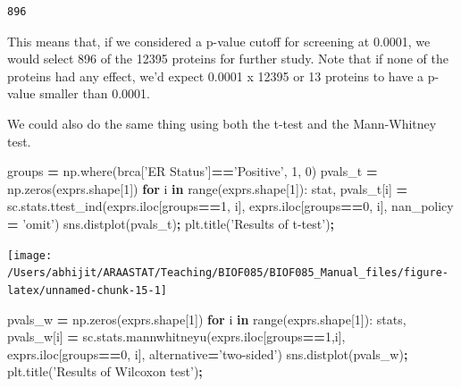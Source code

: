 \documentclass[
  letterpaper,
]{scrbook}
\newenvironment{Shaded}{\begin{snugshade}}{\end{snugshade}}
\newcommand{\BuiltInTok}[1]{#1}
\newcommand{\ControlFlowTok}[1]{\textcolor[rgb]{0.13,0.29,0.53}{\textbf{#1}}}
\newcommand{\DecValTok}[1]{\textcolor[rgb]{0.00,0.00,0.81}{#1}}
\newcommand{\KeywordTok}[1]{\textcolor[rgb]{0.13,0.29,0.53}{\textbf{#1}}}
\newcommand{\NormalTok}[1]{#1}
\newcommand{\OperatorTok}[1]{\textcolor[rgb]{0.81,0.36,0.00}{\textbf{#1}}}
\newcommand{\StringTok}[1]{\textcolor[rgb]{0.31,0.60,0.02}{#1}}
\begin{document}
\begin{verbatim}
896
\end{verbatim}

This means that, if we considered a p-value cutoff for screening at 0.0001, we would select 896 of the 12395 proteins for further study. Note that if none of the proteins had any effect, we'd expect 0.0001 x 12395 or 13 proteins to have a p-value smaller than 0.0001.

We could also do the same thing using both the t-test and the Mann-Whitney test.

\begin{Shaded}
\begin{Highlighting}[]
\NormalTok{groups }\OperatorTok{=}\NormalTok{ np.where(brca[}\StringTok{'ER Status'}\NormalTok{]}\OperatorTok{==}\StringTok{'Positive'}\NormalTok{, }\DecValTok{1}\NormalTok{, }\DecValTok{0}\NormalTok{)}
\NormalTok{pvals_t }\OperatorTok{=}\NormalTok{ np.zeros(exprs.shape[}\DecValTok{1}\NormalTok{])}
\ControlFlowTok{for}\NormalTok{ i }\KeywordTok{in} \BuiltInTok{range}\NormalTok{(exprs.shape[}\DecValTok{1}\NormalTok{]):}
\NormalTok{    stat, pvals_t[i] }\OperatorTok{=}\NormalTok{ sc.stats.ttest_ind(exprs.iloc[groups}\OperatorTok{==}\DecValTok{1}\NormalTok{, i],}
\NormalTok{                              exprs.iloc[groups}\OperatorTok{==}\DecValTok{0}\NormalTok{, i],}
\NormalTok{                              nan_policy }\OperatorTok{=} \StringTok{'omit'}\NormalTok{)}
\NormalTok{sns.distplot(pvals_t)}\OperatorTok{;}
\NormalTok{plt.title(}\StringTok{'Results of t-test'}\NormalTok{)}\OperatorTok{;}
\end{Highlighting}
\end{Shaded}

\begin{center}\texttt{[image: /Users/abhijit/ARAASTAT/Teaching/BIOF085/BIOF085\_Manual\_files/figure-latex/unnamed-chunk-15-1]} \end{center}

\begin{Shaded}
\begin{Highlighting}[]
\NormalTok{pvals_w }\OperatorTok{=}\NormalTok{ np.zeros(exprs.shape[}\DecValTok{1}\NormalTok{])}
\ControlFlowTok{for}\NormalTok{ i }\KeywordTok{in} \BuiltInTok{range}\NormalTok{(exprs.shape[}\DecValTok{1}\NormalTok{]):}
\NormalTok{    stats, pvals_w[i] }\OperatorTok{=}\NormalTok{ sc.stats.mannwhitneyu(exprs.iloc[groups}\OperatorTok{==}\DecValTok{1}\NormalTok{,i], }
\NormalTok{                                            exprs.iloc[groups}\OperatorTok{==}\DecValTok{0}\NormalTok{, i],}
\NormalTok{                                             alternative}\OperatorTok{=}\StringTok{'two-sided'}\NormalTok{)}
\NormalTok{sns.distplot(pvals_w)}\OperatorTok{;}
\NormalTok{plt.title(}\StringTok{'Results of Wilcoxon test'}\NormalTok{)}\OperatorTok{;}
\end{Highlighting}
\end{Shaded}
\end{document}
